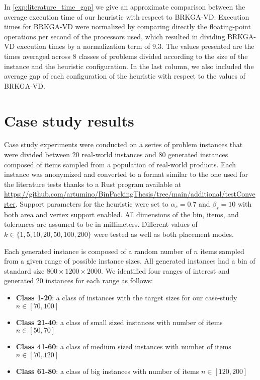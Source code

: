In \cref{exp:literature_time_gap} we give an approximate comparison between the average execution time of our heuristic with respect to BRKGA-VD.
Execution times for BRKGA-VD were normalized by comparing directly the floating-point operations per second of the processors used, which resulted in dividing BRKGA-VD execution times by a normalization term of $9.3$. %
The values presented are the times averaged across 8 classes of problems divided according to the size of the instance and the heuristic configuration. In the last column, we also included the average gap of each configuration of the heuristic with respect to the values of BRKGA-VD.
\label{exp:literature_tests}



\clearpage
\section{Case study results}
Case study experiments were conducted on a series of problem instances that were divided between 20 real-world instances and 80 generated instances composed of items sampled from a population of real-world products.
Each instance was anonymized and converted to a format similar to the one used for the literature tests thanks to a Rust program available at \url{https://github.com/artumino/BinPackingThesis/tree/main/additional/testConverter}.
Support parameters for the heuristic were set to $\alpha_s = 0.7$ and $\beta_s = 10$ with both area and vertex support enabled. All dimensions of the bin, items, and tolerances are assumed to be in millimeters.
Different values of $k \in \{1, 5, 10, 20, 50, 100, 200\}$ were tested as well as both placement modes.

Each generated instance is composed of a random number of $n$ items sampled from a given range of possible instance sizes. All generated instances had a bin of standard size $800 \times 1200 \times 2000$.
We identified four ranges of interest and generated 20 instances for each range as follows:
\begin{itemize}
    \item \textbf{Class 1-20}: a class of instances with the target sizes for our case-study $n \in [70,100]$
    \item \textbf{Class 21-40}: a class of small sized instances with number of items $n \in [50,70]$
    \item \textbf{Class 41-60}: a class of medium sized instances with number of items $n \in [70,120]$
    \item \textbf{Class 61-80}: a class of big instances with number of items $n \in [120,200]$
\end{itemize}

